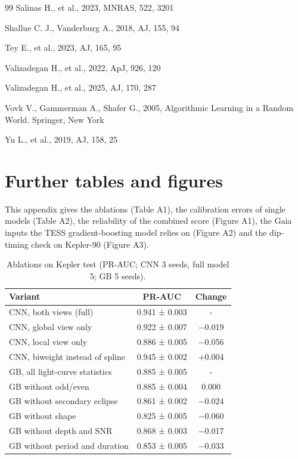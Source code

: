 \documentclass[fleqn,usenatbib]{mnras}
\begin{document}
\begin{thebibliography}{99}
Salinas H., et al., 2023, MNRAS, 522, 3201

Shallue C. J., Vanderburg A., 2018, AJ, 155, 94

Tey E., et al., 2023, AJ, 165, 95

Valizadegan H., et al., 2022, ApJ, 926, 120

Valizadegan H., et al., 2025, AJ, 170, 287

Vovk V., Gammerman A., Shafer G., 2005, Algorithmic Learning in a Random World. Springer, New York

Yu L., et al., 2019, AJ, 158, 25
\end{thebibliography}

\clearpage
\appendix
\section{Further tables and figures}

This appendix gives the ablations (Table A1), the calibration errors of single models (Table A2), the reliability of the combined score (Figure A1), the Gaia inputs the TESS gradient-boosting model relies on (Figure A2) and the dip-timing check on Kepler-90 (Figure A3).

\begin{table}
\centering
\caption{Ablations on Kepler test (PR-AUC; CNN 3 seeds, full model 5; GB 5 seeds).}
\label{tab:a1}
\begin{tabular}{>{\raggedright\arraybackslash}p{3.8cm}cc}
\hline
Variant & PR-AUC & Change \\
\hline
CNN, both views (full) & 0.941 ± 0.003 & - \\
CNN, global view only & 0.922 ± 0.007 & −0.019 \\
CNN, local view only & 0.886 ± 0.005 & −0.056 \\
CNN, biweight instead of spline & 0.945 ± 0.002 & +0.004 \\
GB, all light-curve statistics & 0.885 ± 0.005 & - \\
GB without odd/even & 0.885 ± 0.004 & 0.000 \\
GB without secondary eclipse & 0.861 ± 0.002 & −0.024 \\
GB without shape & 0.825 ± 0.005 & −0.060 \\
GB without depth and SNR & 0.868 ± 0.003 & −0.017 \\
GB without period and duration & 0.853 ± 0.005 & −0.033 \\
\hline
\end{tabular}
\end{table}
\end{document}

